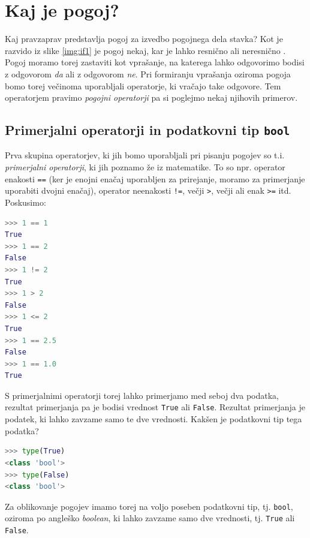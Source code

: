 \section{Kaj je pogoj?}

Kaj pravzaprav predstavlja pogoj za izvedbo pogojnega dela stavka? Kot je razvido iz slike \ref{img:if1} je pogoj nekaj, kar je lahko resnično  ali neresnično . Pogoj moramo torej zastaviti kot vprašanje, na katerega lahko odgovorimo bodisi z odgovorom \emph{da} ali z odgovorom \emph{ne}. Pri formiranju vprašanja oziroma pogoja bomo torej večinoma uporabljali operatorje, ki vračajo take odgovore. Tem operatorjem pravimo \emph{pogojni operatorji} pa si poglejmo nekaj njihovih primerov.

\subsection{Primerjalni operatorji in podatkovni tip \texttt{bool}}

Prva skupina operatorjev, ki jih bomo uporabljali pri pisanju pogojev so t.i. \emph{primerjalni operatorji}, ki jih poznamo že iz matematike. To so npr. operator enakosti \texttt{==} (ker je enojni enačaj uporabljen za prirejanje, moramo za primerjanje uporabiti dvojni enačaj), operator neenakosti \texttt{!=}, večji \texttt{>}, večji ali enak \texttt{>=} itd. Poskusimo:
\begin{lstlisting}[language=Python, showstringspaces=false]
>>> 1 == 1
True
>>> 1 == 2
False
>>> 1 != 2
True
>>> 1 > 2
False
>>> 1 <= 2
True
>>> 1 == 2.5
False
>>> 1 == 1.0
True
\end{lstlisting}
S primerjalnimi operatorji torej lahko primerjamo med seboj dva podatka, rezultat primerjanja pa je bodisi vrednost \texttt{True} ali \texttt{False}. Rezultat primerjanja je podatek, ki lahko zavzame samo te dve vrednosti. Kakšen je podatkovni tip tega podatka?
\begin{lstlisting}[language=Python, showstringspaces=false]
>>> type(True)
<class 'bool'>
>>> type(False)
<class 'bool'>
\end{lstlisting}
Za oblikovanje pogojev imamo torej na voljo poseben podatkovni tip, tj. \texttt{bool}, oziroma po angleško \emph{boolean}, ki lahko zavzame samo dve vrednosti, tj. \texttt{True} ali \texttt{False}. 

